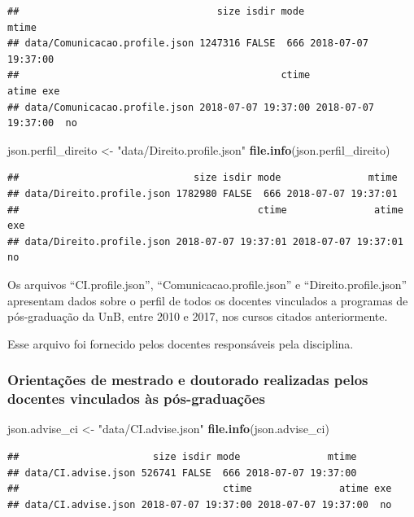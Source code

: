 \documentclass[]{article}
\newenvironment{Shaded}{\begin{snugshade}}{\end{snugshade}}
\newcommand{\KeywordTok}[1]{\textcolor[rgb]{0.13,0.29,0.53}{\textbf{#1}}}
\newcommand{\StringTok}[1]{\textcolor[rgb]{0.31,0.60,0.02}{#1}}
\newcommand{\NormalTok}[1]{#1}
\begin{document}
\begin{verbatim}
##                                  size isdir mode               mtime
## data/Comunicacao.profile.json 1247316 FALSE  666 2018-07-07 19:37:00
##                                             ctime               atime exe
## data/Comunicacao.profile.json 2018-07-07 19:37:00 2018-07-07 19:37:00  no
\end{verbatim}

\begin{Shaded}
\begin{Highlighting}[]
\NormalTok{json.perfil_direito <-}\StringTok{ "data/Direito.profile.json"}
\KeywordTok{file.info}\NormalTok{(json.perfil_direito)}
\end{Highlighting}
\end{Shaded}

\begin{verbatim}
##                              size isdir mode               mtime
## data/Direito.profile.json 1782980 FALSE  666 2018-07-07 19:37:01
##                                         ctime               atime exe
## data/Direito.profile.json 2018-07-07 19:37:01 2018-07-07 19:37:01  no
\end{verbatim}

Os arquivos ``CI.profile.json'', ``Comunicacao.profile.json'' e
``Direito.profile.json'' apresentam dados sobre o perfil de todos os
docentes vinculados a programas de pós-graduação da UnB, entre 2010 e
2017, nos cursos citados anteriormente.

Esse arquivo foi fornecido pelos docentes responsáveis pela disciplina.

\subsubsection{Orientações de mestrado e doutorado realizadas pelos
docentes vinculados às
pós-graduações}\label{orientacoes-de-mestrado-e-doutorado-realizadas-pelos-docentes-vinculados-as-pos-graduacoes}

\begin{Shaded}
\begin{Highlighting}[]
\NormalTok{json.advise_ci <-}\StringTok{ "data/CI.advise.json"}
\KeywordTok{file.info}\NormalTok{(json.advise_ci)}
\end{Highlighting}
\end{Shaded}

\begin{verbatim}
##                       size isdir mode               mtime
## data/CI.advise.json 526741 FALSE  666 2018-07-07 19:37:00
##                                   ctime               atime exe
## data/CI.advise.json 2018-07-07 19:37:00 2018-07-07 19:37:00  no
\end{verbatim}
\end{document}

